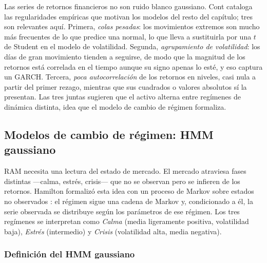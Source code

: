 Las series de retornos financieros no son ruido blanco gaussiano. Cont \cite{cont2001} cataloga las regularidades empíricas que motivan los modelos del resto del capítulo; tres son relevantes aquí. Primera, \emph{colas pesadas}: los movimientos extremos son mucho más frecuentes de lo que predice una normal, lo que lleva a sustituirla por una $t$ de Student en el modelo de volatilidad. Segunda, \emph{agrupamiento de volatilidad}: los días de gran movimiento tienden a seguirse, de modo que la magnitud de los retornos está correlada en el tiempo aunque su signo apenas lo esté, y eso captura un GARCH. Tercera, \emph{poca autocorrelación} de los retornos en niveles, casi nula a partir del primer rezago, mientras que sus cuadrados o valores absolutos sí la presentan. Las tres juntas sugieren que el activo alterna entre regímenes de dinámica distinta, idea que el modelo de cambio de régimen formaliza.

\subsection{Modelos de cambio de régimen: HMM gaussiano}
\label{sec:hmm}

RAM necesita una lectura del estado de mercado. El mercado atraviesa fases distintas —calma, estrés, crisis— que no se observan pero se infieren de los retornos. Hamilton formalizó esta idea con un proceso de Markov sobre estados no observados \cite{hamilton1989}: el régimen sigue una cadena de Markov y, condicionado a él, la serie observada se distribuye según los parámetros de ese régimen. Los tres regímenes se interpretan como \emph{Calma} (media ligeramente positiva, volatilidad baja), \emph{Estrés} (intermedio) y \emph{Crisis} (volatilidad alta, media negativa).

\subsubsection{Definición del HMM gaussiano}
\label{sec:hmm-def}

